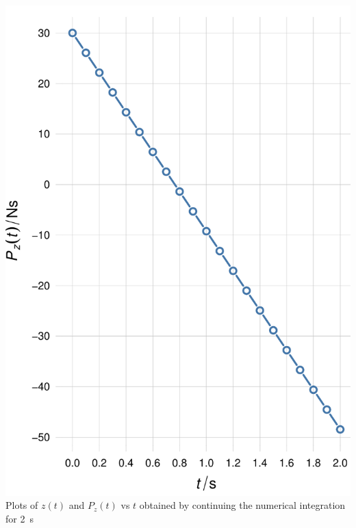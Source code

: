 \documentclass[a4paper,12pt,%
onecolumn,oneside,%
british%
]{memoir}
\renewcommand*{\|}[1][]{\nonscript\:#1\vert\nonscript\:\mathopen{}}
\begin{document}
{\includegraphics[width=\linewidth]{images/plot_tennisball_P.pdf}%
\\[\jot]\footnotesize\flushleftright\color{mpcolor}%
Plots of $z(t)$ and $P_{z}(t)$ vs $t$ obtained by continuing the numerical integration for \qty{2}{s}%
}%
\end{document}
